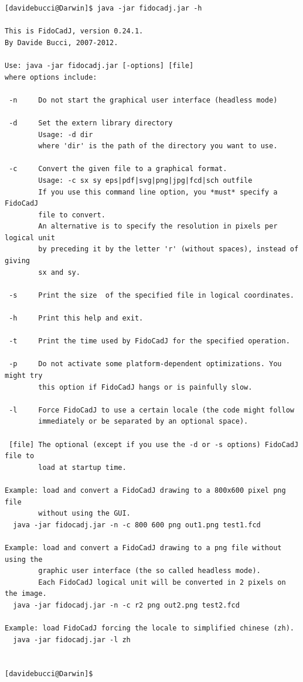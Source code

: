 \documentclass[10pt,a4paper,twoside]{scrreprt}
\begin{document}
\begin{lstlisting}
[davidebucci@Darwin]$ java -jar fidocadj.jar -h

This is FidoCadJ, version 0.24.1.
By Davide Bucci, 2007-2012.

Use: java -jar fidocadj.jar [-options] [file] 
where options include:

 -n     Do not start the graphical user interface (headless mode)

 -d     Set the extern library directory
        Usage: -d dir
        where 'dir' is the path of the directory you want to use.

 -c     Convert the given file to a graphical format.
        Usage: -c sx sy eps|pdf|svg|png|jpg|fcd|sch outfile
        If you use this command line option, you *must* specify a FidoCadJ
        file to convert.
        An alternative is to specify the resolution in pixels per logical unit
        by preceding it by the letter 'r' (without spaces), instead of giving
        sx and sy.

 -s     Print the size  of the specified file in logical coordinates.

 -h     Print this help and exit.

 -t     Print the time used by FidoCadJ for the specified operation.

 -p     Do not activate some platform-dependent optimizations. You might try
        this option if FidoCadJ hangs or is painfully slow.

 -l     Force FidoCadJ to use a certain locale (the code might follow
        immediately or be separated by an optional space).

 [file] The optional (except if you use the -d or -s options) FidoCadJ file to
        load at startup time.

Example: load and convert a FidoCadJ drawing to a 800x600 pixel png file
        without using the GUI.
  java -jar fidocadj.jar -n -c 800 600 png out1.png test1.fcd

Example: load and convert a FidoCadJ drawing to a png file without using the
        graphic user interface (the so called headless mode).
        Each FidoCadJ logical unit will be converted in 2 pixels on the image.
  java -jar fidocadj.jar -n -c r2 png out2.png test2.fcd

Example: load FidoCadJ forcing the locale to simplified chinese (zh).
  java -jar fidocadj.jar -l zh


[davidebucci@Darwin]$
\end{lstlisting}
\lstset{language=FIDOCAD,
    basicstyle=\small\ttfamily}
    
\end{document}
